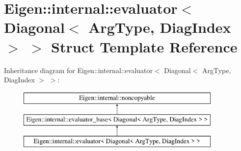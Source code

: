 \hypertarget{struct_eigen_1_1internal_1_1evaluator_3_01_diagonal_3_01_arg_type_00_01_diag_index_01_4_01_4}{}\section{Eigen\+::internal\+::evaluator$<$ Diagonal$<$ Arg\+Type, Diag\+Index $>$ $>$ Struct Template Reference}
\label{struct_eigen_1_1internal_1_1evaluator_3_01_diagonal_3_01_arg_type_00_01_diag_index_01_4_01_4}
Inheritance diagram for Eigen\+::internal\+::evaluator$<$ Diagonal$<$ Arg\+Type, Diag\+Index $>$ $>$\+:\begin{figure}[H]
\begin{center}
\leavevmode
\includegraphics[height=3.000000cm]{struct_eigen_1_1internal_1_1evaluator_3_01_diagonal_3_01_arg_type_00_01_diag_index_01_4_01_4}
\end{center}
\end{figure}

